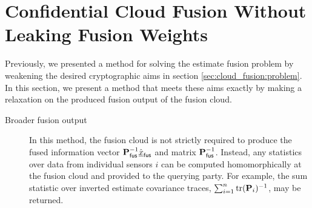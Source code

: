 % 
%                                                                                           
%                                                                                           
%                                                                                           
% 

\section{Confidential Cloud Fusion Without Leaking Fusion Weights}\label{sec:cloud_fusion:secfci2}
Previously, we presented a method for solving the estimate fusion problem by weakening the desired cryptographic aims in section \ref{sec:cloud_fusion:problem}. In this section, we present a method that meets these aims exactly by making a relaxation on the produced fusion output of the fusion cloud.
\begin{description}
    \item[Broader fusion output] In this method, the fusion cloud is not strictly required to produce the fused information vector ${{\mathbf{P}}}_{\mathsf{fus}}^{-1}\hat{{\underline{x}}}_{\mathsf{fus}}$ and matrix ${{\mathbf{P}}}_{\mathsf{fus}}^{-1}$. Instead, any statistics over data from individual sensors $i$ can be computed homomorphically at the fusion cloud and provided to the querying party. For example, the sum statistic over inverted estimate covariance traces, $\sum_{i=1}^n \operatorname{tr}({{\mathbf{P}}}_i)^{-1}$, may be returned.
\end{description}


